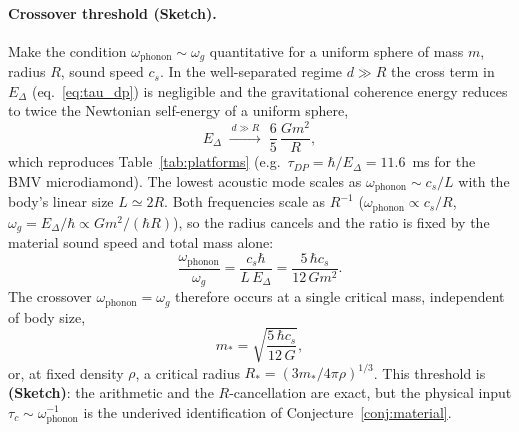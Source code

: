 \documentclass[12pt,a4paper]{article}
\theoremstyle{remark}
\begin{document}
\paragraph{Crossover threshold (Sketch).} Make the condition
$\omega_{\text{phonon}}\sim\omega_g$ quantitative for a uniform sphere of mass $m$,
radius $R$, sound speed $c_s$. In the well-separated regime $d\gg R$ the cross term in
$E_\Delta$ (eq.~\eqref{eq:tau_dp}) is negligible and the gravitational coherence energy
reduces to twice the Newtonian self-energy of a uniform sphere,
\begin{equation}
E_\Delta \;\xrightarrow{\,d\gg R\,}\; \frac{6}{5}\,\frac{Gm^2}{R},
\label{eq:Edelta_selfenergy}
\end{equation}
which reproduces Table~\ref{tab:platforms} (e.g.\ $\tau_{DP}=\hbar/E_\Delta=11.6$~ms for
the BMV microdiamond). The lowest acoustic mode scales as $\omega_{\text{phonon}}\sim
c_s/L$ with the body's linear size $L\simeq 2R$. Both frequencies scale as $R^{-1}$
($\omega_{\text{phonon}}\propto c_s/R$, $\omega_g=E_\Delta/\hbar\propto Gm^2/(\hbar R)$),
so the radius cancels and the ratio is fixed by the material sound speed and total mass
alone:
\begin{equation}
\frac{\omega_{\text{phonon}}}{\omega_g}
= \frac{c_s\hbar}{L\,E_\Delta}
= \frac{5\,\hbar c_s}{12\,G m^2}.
\label{eq:crossover_ratio}
\end{equation}
The crossover $\omega_{\text{phonon}}=\omega_g$ therefore occurs at a single critical
mass, independent of body size,
\begin{equation}
m_\ast = \sqrt{\frac{5\,\hbar c_s}{12\,G}},
\label{eq:mstar}
\end{equation}
or, at fixed density $\rho$, a critical radius $R_\ast=(3m_\ast/4\pi\rho)^{1/3}$. This
threshold is \textbf{(Sketch)}: the arithmetic and the $R$-cancellation are exact, but the
physical input $\tau_c\sim\omega_{\text{phonon}}^{-1}$ is the underived identification of
Conjecture~\ref{conj:material}.
\end{document}
